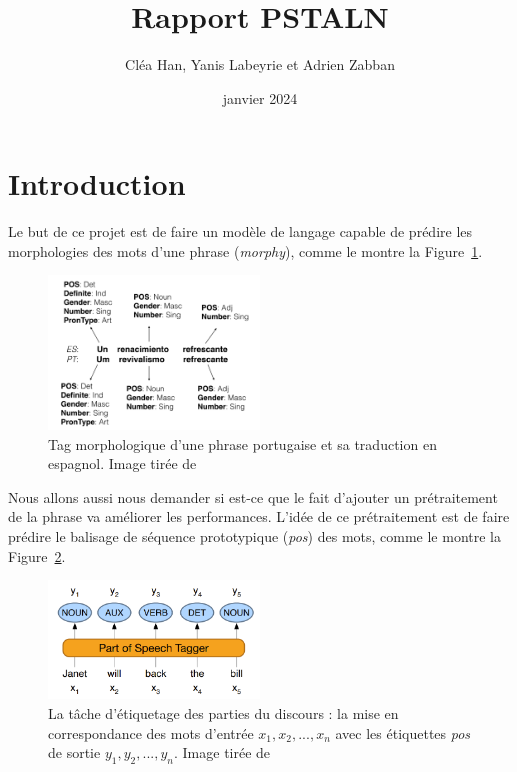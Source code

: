 \documentclass[a4paper]{article}
\title{Rapport PSTALN}
\author{Cléa Han, Yanis Labeyrie et Adrien Zabban}
\date{janvier 2024}
\begin{document}
\maketitle
\bigskip
\tableofcontents
\newpage

\section{Introduction}

Le but de ce projet est de faire un modèle de langage capable de prédire les morphologies des mots d'une phrase
(\textit{morphy}), comme le montre la Figure~\ref{fig: example morphy}.

\begin{figure}[H]
    \centering
    \includegraphics[width=0.5\textwidth]{morphy.png}
    \caption{Tag morphologique d'une phrase portugaise et sa traduction en espagnol.
    Image tirée de~\cite{malaviya-etal-2018-neural}}
    \label{fig: example morphy}
\end{figure}    

Nous allons aussi nous demander si est-ce que le fait d'ajouter un prétraitement de la phrase va améliorer
les performances. L'idée de ce prétraitement est de faire prédire le balisage de séquence
prototypique (\textit{pos}) des mots, comme le montre la Figure~\ref{fig: example pos}.

\begin{figure}[H]
    \centering
    \includegraphics[width=0.5\textwidth]{pos.png}
    \caption{La tâche d'étiquetage des parties du discours : la mise en correspondance des mots d'entrée 
    $x_1, x_2,..., x_n$ avec les étiquettes \textit{pos} de sortie $y_1, y_2,..., y_n$.
    Image tirée de~\cite{pos}}
    \label{fig: example pos}
\end{figure} 
\end{document}
